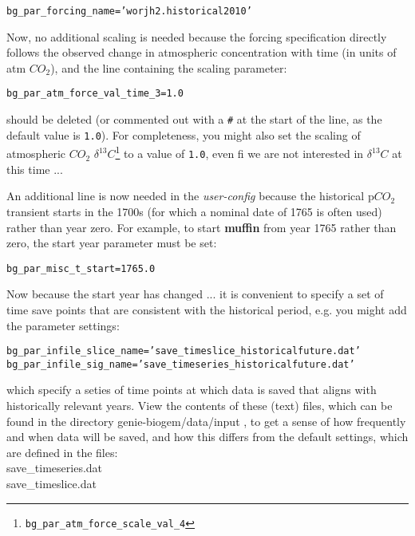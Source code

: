 \documentclass[11pt,fleqn]{book} %
\begin{document}
\vspace{-2pt}\begin{verbatim}
bg_par_forcing_name=’worjh2.historical2010’
\end{verbatim}\vspace{-2pt}
Now, no additional scaling is needed because the forcing specification directly follows the observed change in atmospheric concentration with time (in units of atm \(CO_{2}\)), and the line containing the scaling parameter:
\vspace{-2pt}\begin{verbatim}
bg_par_atm_force_val_time_3=1.0
\end{verbatim}\vspace{-2pt}
should be deleted (or commented out with a \texttt{\#} at the start of the line, as the default value is \texttt{1.0}).
For completeness, you might also set the scaling of atmospheric \(CO_{2}\) \(\delta^{13}C\)\footnote{\texttt{bg\_par\_atm\_force\_scale\_val\_4}} to a value of \texttt{1.0}, even fi we are not interested in \(\delta^{13}C\) at this time ...

An additional line is now needed in the \textit{user-config} because the historical p\(CO_{2}\) transient starts in the 1700s (for which a nominal date of 1765 is often used) rather than year zero. For example, to start \textbf{muffin} from year 1765 rather than zero, the start year parameter must be set:
\vspace{-2pt}\begin{verbatim}
bg_par_misc_t_start=1765.0
\end{verbatim}\vspace{-2pt}
Now because the start year has changed ... it is convenient to specify a set of time save points that are consistent with the historical period, e.g. you might add the parameter settings:
\vspace{-2pt}\begin{verbatim}
bg_par_infile_slice_name=’save_timeslice_historicalfuture.dat’
bg_par_infile_sig_name=’save_timeseries_historicalfuture.dat’
\end{verbatim}\vspace{-2pt}
which specify a seties of time points at which data is saved that aligns with historically relevant years. View the contents of these (text) files, which can be found in the directory \footnotesize\textsf{genie-biogem/data/input }\normalsize, to get a sense of how frequently and when data will be saved, and how this differs from the default settings, which are defined in the files:
\vspace{2pt}
\\ \footnotesize\textsf{save\_timeseries.dat }\normalsize
\\ \footnotesize\textsf{save\_timeslice.dat }\normalsize
\vspace{2pt}
\end{document}
